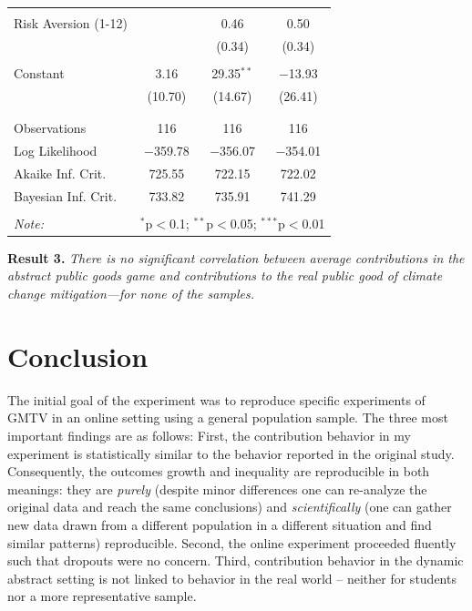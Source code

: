 \documentclass[
  authoryear,
  review,
  3p,
  onecolumn]{elsarticle}
\begin{document}
\begin{table}[!htbp]
\begin{tabular}{@{\extracolsep{5pt}}lccc}
  & & & \\ 
 Risk Aversion (1-12) &  & 0.46 & 0.50 \\ 
  &  & (0.34) & (0.34) \\ 
  & & & \\ 
 Constant & 3.16 & 29.35$^{**}$ & $-$13.93 \\ 
  & (10.70) & (14.67) & (26.41) \\ 
  & & & \\ 
\hline \\[-1.8ex] 
Observations & 116 & 116 & 116 \\ 
Log Likelihood & $-$359.78 & $-$356.07 & $-$354.01 \\ 
Akaike Inf. Crit. & 725.55 & 722.15 & 722.02 \\ 
Bayesian Inf. Crit. & 733.82 & 735.91 & 741.29 \\ 
\hline 
\hline \\[-1.8ex] 
\textit{Note:}  & \multicolumn{3}{r}{$^{*}$p$<$0.1; $^{**}$p$<$0.05; $^{***}$p$<$0.01} \\ 
\end{tabular} 
\end{table}

\textbf{Result 3.} \emph{There is no significant correlation between
average contributions in the abstract public goods game and
contributions to the real public good of climate change mitigation---for
none of the samples.}

\hypertarget{sec-conclusion}{%
\section{Conclusion}\label{sec-conclusion}}

The initial goal of the experiment was to reproduce specific experiments
of GMTV in an online setting using a general population sample. The
three most important findings are as follows: First, the contribution
behavior in my experiment is statistically similar to the behavior
reported in the original study. Consequently, the outcomes growth and
inequality are reproducible in both meanings: they are \emph{purely}
(despite minor differences one can re-analyze the original data and
reach the same conclusions) and \emph{scientifically} (one can gather
new data drawn from a different population in a different situation and
find similar patterns) reproducible. Second, the online experiment
proceeded fluently such that dropouts were no concern. Third,
contribution behavior in the dynamic abstract setting is not linked to
behavior in the real world -- neither for students nor a more
representative sample.
\end{document}
